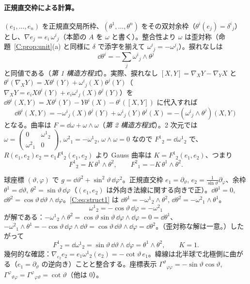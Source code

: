\paragraph{正規直交枠による計算。}$(e_1,\dots,e_n)$ を正規直交局所枠、$(\theta^1,\dots,\theta^n)$ をその双対余枠（$\theta^i(e_j)=\delta^i{}_j$）とし、$\nabla e_j=e_i\,\omega^i{}_j$（本節の $A$ を $\omega$ と書く）。整合性より $\omega$ は歪対称（命題~\ref{C:prop:unit}(a) と同様に $\delta$ で添字を揃えて $\omega^i{}_j=-\omega^j{}_i$）。捩れなしは
\begin{equation}\label{C:eq:struct1}
\dd\theta^i=-\sum_j\omega^i{}_j\wedge\theta^j
\end{equation}
と同値である（\emph{第 1 構造方程式}）。実際、捩れなし $[X,Y]=\nabla_XY-\nabla_YX$ と $\theta^i(\nabla_XY)=X\theta^i(Y)+\omega^i{}_j(X)\theta^j(Y)$（$\nabla_XY=e_iX\theta^i(Y)+e_i\omega^i{}_j(X)\theta^j(Y)$）を $\dd\theta^i(X,Y)=X\theta^i(Y)-Y\theta^i(X)-\theta^i([X,Y])$ に代入すれば
\[
\dd\theta^i(X,Y)=-\omega^i{}_j(X)\theta^j(Y)+\omega^i{}_j(Y)\theta^j(X)=-(\omega^i{}_j\wedge\theta^j)(X,Y)
\]
となる。曲率は $F=\dd\omega+\omega\wedge\omega$（\emph{第 2 構造方程式}）。2 次元では $\omega=\begin{pmatrix}0&\omega^1{}_2\\\omega^2{}_1&0\end{pmatrix}$, $\omega^2{}_1=-\omega^1{}_2$, $\omega\wedge\omega=0$ なので $F^1{}_2=\dd\omega^1{}_2$ で、$R(e_1,e_2)e_2=e_1F^1{}_2(e_1,e_2)$ より Gauss 曲率は $K=F^1{}_2(e_1,e_2)$、つまり
\begin{equation}\label{C:eq:Gauss}
F^1{}_2=K\,\theta^1\wedge\theta^2,\qquad F^2{}_1=-K\,\theta^1\wedge\theta^2.
\end{equation}

\begin{ex}\label{C:ex:S2}
球座標 $(\vartheta,\varphi)$ で $g=\dd\vartheta^2+\sin^2\vartheta\,\dd\varphi^2$。正規直交枠 $e_1=\partial_\vartheta$, $e_2=\frac1{\sin\vartheta}\partial_\varphi$、余枠 $\theta^1=\dd\vartheta$, $\theta^2=\sin\vartheta\,\dd\varphi$（$(e_1,e_2)$ は外向き法線に関する向きで正）。$\dd\theta^1=0$, $\dd\theta^2=\cos\vartheta\,\dd\vartheta\wedge\dd\varphi$。\eqref{C:eq:struct1} は $\dd\theta^1=-\omega^1{}_2\wedge\theta^2$, $\dd\theta^2=-\omega^2{}_1\wedge\theta^1$。
\[
\omega^1{}_2=-\cos\vartheta\,\dd\varphi=-\omega^2{}_1
\]
が解である：$-\omega^1{}_2\wedge\theta^2=\cos\vartheta\sin\vartheta\,\dd\varphi\wedge\dd\varphi=0=\dd\theta^1$、$-\omega^2{}_1\wedge\theta^1=-\cos\vartheta\,\dd\varphi\wedge\dd\vartheta=\cos\vartheta\,\dd\vartheta\wedge\dd\varphi=\dd\theta^2$。（歪対称な解は一意。）したがって
\[
F^1{}_2=\dd\omega^1{}_2=\sin\vartheta\,\dd\vartheta\wedge\dd\varphi=\theta^1\wedge\theta^2,\qquad K=1.
\]
幾何的な確認：$\nabla_{e_2}e_2=e_1\omega^1{}_2(e_2)=-\cot\vartheta\,e_1$。緯線は北半球で北極側に曲がる（$e_1=\partial_\vartheta$ の逆向き）ことと整合する。座標表示 $\Gamma^\vartheta{}_{\varphi\varphi}=-\sin\vartheta\cos\vartheta$, $\Gamma^\varphi{}_{\vartheta\varphi}=\Gamma^\varphi{}_{\varphi\vartheta}=\cot\vartheta$（他は $0$）。
\end{ex}

